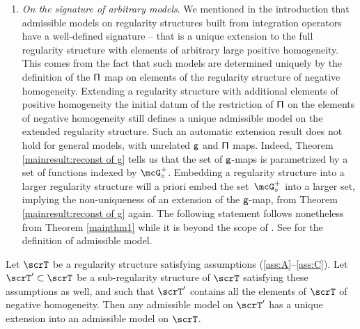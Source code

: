 \begin{remarks*}
\begin{enumerate}
(Theorem \ref{mainthm1} cannot be applied in a finite region $[0,T]$ directly. To overcome this point, we extend a function $f\in C([0,T], \bbR^\ell)$ to $[-T,T]$ symmetrically, and extend it to $\big[(2n-1)T, (2n+1)T\big]$ for any $n\in\bbZ$ periodically. Then for any $\alpha\in(0,1)$, the Hölder space $C^\alpha([0,T],\bbR^\ell)$ is identified with the space
\[
C_{p,s}^\alpha(\bbR, \bbR^\ell) := \Big\{ f\in C^\alpha(\bbR,\bbR^\ell)\,;\, f(t)=f(-t),\ f(t+2T)=f(t)\ \text{for any $t\in \bbR$} \Big\}.
\]
Note that Littlewood-Paley blocks $\Delta_i$ preserve the symmetry and periodicity, so such spaces are closed under paradifferential operators (paraproduct, its two-parameter extension, etc.) used in this paper. Hence we can apply Theorem \ref{mainthm1} to such spaces.)

\item
\emph{On the signature of arbitrary models}. We mentioned in the introduction that admissible models on regularity structures built from integration operators have a well-defined signature -- that is a unique extension to the full regularity structure with elements of arbitrary large positive homogeneity. This comes from the fact that such models are determined uniquely by the definition of the $\sf \Pi$ map on elements of the regularity structure of negative homogeneity. Extending a regularity structure with additional elements of positive homogeneity the initial datum of the restriction of $\sf \Pi$ on the elements of negative homogeneity still defines a unique admissible model on the extended regularity structure. Such an automatic extension result does not hold for general models, with unrelated $\sf g$ and $\sf \Pi$ maps. Indeed, Theorem \ref{mainresult:reconst of g} tells us that the set of $\sf g$-maps is parametrized by a set of functions indexed by $\mcG^+_\circ$. Embedding a regularity structure into a larger regularity structure will a priori embed the set~$\mcG^+_\circ$ into a larger set, implying the non-uniqueness of an extension of the $\sf g$-map, from Theorem \ref{mainresult:reconst of g} again. The following statement follows nonetheless from Theorem \ref{mainthm1} while it is beyond the scope of \cite[Th.\,21]{BH}. See \cite[\S4]{BH} for the definition of admissible model.
\end{enumerate}
\end{remarks*}

\begin{cor}
Let $\scrT$ be a regularity structure satisfying assumptions \textup{(\ref{ass:A}--\ref{ass:C})}. Let $\scrT'\subset\scrT$ be a sub-regularity structure of $\scrT$ satisfying these assumptions as well, and such that $\scrT'$ contains all the elements of $\scrT$ of negative homogeneity. Then any admissible model on $\scrT'$ has a unique extension into an admissible model on $\scrT$.
\end{cor}

